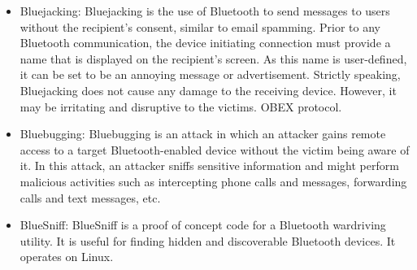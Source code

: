 \begin{itemize}
    \item Bluejacking: Bluejacking is the use of Bluetooth to send messages to users without the recipient's consent, similar to email spamming. Prior to any Bluetooth communication, the device initiating connection must provide a name that is displayed on the recipient's screen. As this name is user-defined, it can be set to be an annoying message or advertisement. Strictly speaking, Bluejacking does not cause any damage to the receiving device. However, it may be irritating and disruptive to the victims. OBEX protocol.
    \item Bluebugging: Bluebugging is an attack in which an attacker gains remote access to a target Bluetooth-enabled device without the victim being aware of it. In this attack, an attacker sniffs sensitive information and might perform malicious activities such as intercepting phone calls and messages, forwarding calls and text messages, etc.
    \item BlueSniff: BlueSniff is a proof of concept code for a Bluetooth wardriving utility. It is useful for finding hidden and discoverable Bluetooth devices. It operates on Linux.
\end{itemize}
